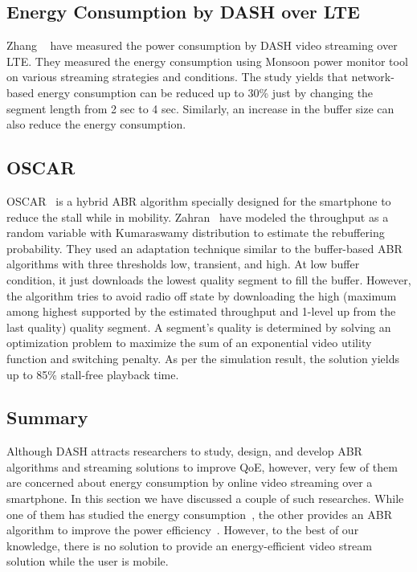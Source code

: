 \subsection{Energy Consumption by DASH over LTE}
Zhang \etal\ \cite{10.1145/2910018.2910656} have measured the power consumption by DASH video streaming over LTE. They measured the energy consumption using Monsoon power monitor \cite{monsoonmonitor} tool on various streaming strategies and conditions. The study yields that network-based energy consumption can be reduced up to 30\% just by changing the segment length from 2 sec to 4 sec. Similarly, an increase in the buffer size can also reduce the energy consumption.

\subsection{OSCAR}
OSCAR~\cite{10.1145/2910018.2910655} is a hybrid ABR algorithm specially designed for the smartphone to reduce the stall while in mobility. Zahran \etal\ have modeled the throughput as a random variable with Kumaraswamy distribution \cite{jones2009kumaraswamy} to estimate the rebuffering probability. They used an adaptation technique similar to the buffer-based ABR algorithms with three thresholds low, transient, and high. At low buffer condition, it just downloads the lowest quality segment to fill the buffer. However, the algorithm tries to avoid radio off state by downloading the high (maximum among highest supported by the estimated throughput and 1-level up from the last quality) quality segment. A segment's quality is determined by solving an optimization problem to maximize the sum of an exponential video utility function and switching penalty. As per the simulation result, the solution yields up to 85\% stall-free playback time.

\subsection{Summary}
Although DASH attracts researchers to study, design, and develop ABR algorithms and streaming solutions to improve QoE, however, very few of them are concerned about energy consumption by online video streaming over a smartphone. In this section we have discussed a couple of such researches. While one of them has studied the energy consumption~\cite{10.1145/2910018.2910656}, the other provides an ABR algorithm to improve the power efficiency~\cite{10.1145/2910018.2910655}. However, to the best of our knowledge, there is no solution to provide an energy-efficient video stream solution while the user is mobile.